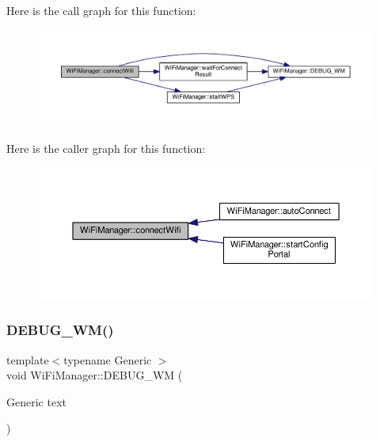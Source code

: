 Here is the call graph for this function\+:\nopagebreak
\begin{figure}[H]
\begin{center}
\leavevmode
\includegraphics[width=350pt]{d4/dc8/class_wi_fi_manager_ae0ae27b5543b47585728c084c3bbdca7_cgraph}
\end{center}
\end{figure}
Here is the caller graph for this function\+:\nopagebreak
\begin{figure}[H]
\begin{center}
\leavevmode
\includegraphics[width=350pt]{d4/dc8/class_wi_fi_manager_ae0ae27b5543b47585728c084c3bbdca7_icgraph}
\end{center}
\end{figure}
\mbox{\label{class_wi_fi_manager_ae5f595c670ccbcf9a191baf50f5c7c26}} 
\subsubsection{\texorpdfstring{D\+E\+B\+U\+G\+\_\+\+W\+M()}{DEBUG\_WM()}}
{\footnotesize\ttfamily template$<$typename Generic $>$ \\
void Wi\+Fi\+Manager\+::\+D\+E\+B\+U\+G\+\_\+\+WM (\begin{DoxyParamCaption}\item[{Generic}]{text }\end{DoxyParamCaption})\hspace{0.3cm}{\ttfamily [private]}}



